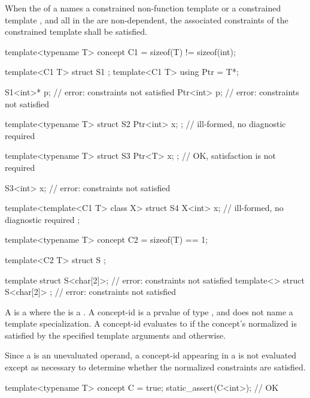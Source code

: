 \pnum
When the 
of a 
names a constrained non-function template
or
a constrained template ,
and
all 
in the 
are non-dependent,
the associated constraints
of the constrained template
shall be satisfied.
\begin{example}
\begin{codeblock}
template<typename T> concept C1 = sizeof(T) != sizeof(int);

template<C1 T> struct S1 { };
template<C1 T> using Ptr = T*;

S1<int>* p;                         // error: constraints not satisfied
Ptr<int> p;                         // error: constraints not satisfied

template<typename T>
struct S2 { Ptr<int> x; };          // ill-formed, no diagnostic required

template<typename T>
struct S3 { Ptr<T> x; };            // OK, satisfaction is not required

S3<int> x;                          // error: constraints not satisfied

template<template<C1 T> class X>
struct S4 {
  X<int> x;                         // ill-formed, no diagnostic required
};

template<typename T> concept C2 = sizeof(T) == 1;

template<C2 T> struct S { };

template struct S<char[2]>;         // error: constraints not satisfied
template<> struct S<char[2]> { };   // error: constraints not satisfied
\end{codeblock}
\end{example}

\pnum
A  is a 
where the  is a .
A concept-id is a prvalue of type , and
does not name a template specialization.
A concept-id evaluates to 
if the concept's
normalized 
is satisfied by the specified template arguments and
 otherwise.
\begin{note}
Since a  is an unevaluated operand,
a concept-id appearing in a 
is not evaluated except as necessary
to determine whether the normalized constraints are satisfied.
\end{note}
\begin{example}
\begin{codeblock}
template<typename T> concept C = true;
static_assert(C<int>);      // OK
\end{codeblock}
\end{example}

